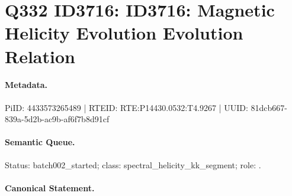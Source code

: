 \section*{Q332 ID3716: ID3716: Magnetic Helicity Evolution Evolution Relation}
\paragraph{Metadata.}
PiID: 4433573265489 | RTEID: RTE:P14430.0532:T4.9267 | UUID: 81dcb667-839a-5d2b-ac9b-af6f7b8d91cf

\paragraph{Semantic Queue.}
Status: batch002\_started; class: spectral\_helicity\_kk\_segment; role: .

\paragraph{Canonical Statement.}

